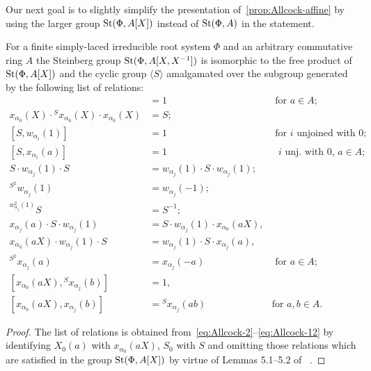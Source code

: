 Our next goal is to slightly simplify the presentation of~\cref{prop:Allcock-affine} by using the larger group $\operatorname{St}(\Phi, A[X])$ instead of $\operatorname{St}(\Phi, A)$ in the statement.
\begin{cor} \label{cor:Allcock-simpler}
    For a finite simply-laced irreducible root system $\Phi$ and an arbitrary commutative ring $A$ the Steinberg group $\operatorname{St}(\Phi, A[X, X^{-1}])$ is isomorphic
    to the free product of $\operatorname{St}(\Phi, A[X])$ and the cyclic group $\langle S \rangle$ amalgamated over the subgroup generated by the following list of relations:
    \begin{align}
    [S^2, x_{\alpha_0}(aX)] & = 1 & \text{ for $a \in A$; } \label{eq:simpler-2} \\
    x_{\alpha_0}(X) \cdot {}^{S} x_{\alpha_0}(X) \cdot x_{\alpha_0}(X) & = S; \label{eq:simpler-3} \\
    [S, w_{\alpha_i}(1)] & = 1 & \text{ for $i$ unjoined with $0$;} \label{eq:simpler-4} \\
    [S, x_{\alpha_i}(a)] & = 1 &  \text{ $i$ unj. with $0$, $a \in A$; } \label{eq:simpler-5-1}\\
    S \cdot w_{\alpha_j}(1) \cdot S & = w_{\alpha_j}(1) \cdot S \cdot w_{\alpha_j}(1); \label{eq:simpler-7} \\
    {}^{S^2} w_{\alpha_j}(1) & = w_{\alpha_j}(-1); \label{eq:simpler-8-1} \\
    {}^{w_{\alpha_j}^2(1)} S & = S^{-1}; \label{eq:simpler-8-2} \\
    x_{\alpha_j}(a) \cdot S \cdot w_{\alpha_j}(1) & = S \cdot w_{\alpha_j}(1) \cdot x_{\alpha_0}(aX), & \label{eq:simpler-9-1} \\
    x_{\alpha_0}(aX) \cdot w_{\alpha_j}(1) \cdot S & = w_{\alpha_j}(1) \cdot S \cdot x_{\alpha_j}(a), & \label{eq:simpler-9-2} \\
    {}^{S^2} x_{\alpha_j}(a) & = x_{\alpha_j}(-a) & \text{ for $a \in A$; } \label{eq:simpler-10-1} \\
    [x_{\alpha_0}(aX), {}^{S} x_{\alpha_j}(b)] &= 1, & \label{eq:simpler-11-1} \\
    [x_{\alpha_0}(aX), x_{\alpha_j}(b)] &= {}^{S} x_{\alpha_j}(ab) & \text{for $a, b \in A.$} \label{eq:simpler-12}
    \end{align}
\end{cor}
\begin{proof}
    The list of relations is obtained from~\eqref{eq:Allcock-2}--\eqref{eq:Allcock-12} by identifying $X_0(a)$ with $x_{\alpha_0}(aX)$, $S_0$ with $S$ and omitting those relations
     which are satisfied in the group $\operatorname{St}(\Phi, A[X])$ by virtue of Lemmas 5.1--5.2 of ~\cite{Ma69}.
\end{proof}

